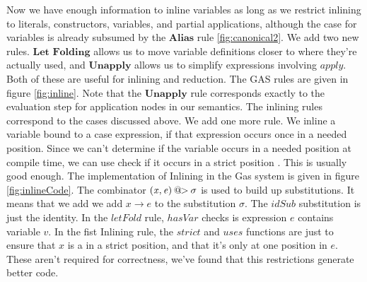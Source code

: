 \documentclass{book}
\theoremstyle{definition}
\newcommand{\Varid}[1]{\mathit{#1}}
\begin{document}
Now we have enough information to inline variables as long as we restrict inlining to
literals, constructors, variables, and partial applications,
although the case for variables is already subsumed by the \ensuremath{\textbf{Alias}} rule \ref{fig:canonical2}.
We add two new rules.  \ensuremath{\textbf{Let Folding}} allows us to move variable definitions
closer to where they're actually used,
and \ensuremath{\textbf{Unapply}} allows us to simplify expressions involving \ensuremath{\Varid{apply}}.
Both of these are useful for inlining and reduction.
The GAS rules are given in figure \ref{fig:inline}.
Note that the \ensuremath{\textbf{Unapply}} rule corresponds exactly to the evaluation step for application nodes
in our semantics.
The inlining rules correspond to the cases discussed above.
We add one more rule.  We inline a variable bound to a case expression,
if that expression occurs once in a needed position.
Since we can't determine if the variable occurs in a needed position at compile time,
we can use check if it occurs in a strict position \cite{strictAbstract}.
This is usually good enough.
The implementation of Inlining in the Gas system is given in figure \ref{fig:inlineCode}.
The combinator \ensuremath{(\Varid{x},\Varid{e})\hspace{2pt}\text{@}\hspace{-3pt}\mathbin{>}\sigma} is used to build up substitutions.
It means that we add we add $x \to e$ to the substitution \ensuremath{\sigma}.
The \ensuremath{\Varid{idSub}} substitution is just the identity.
In the \ensuremath{\Varid{letFold}} rule, \ensuremath{\Varid{hasVar}} checks is expression \ensuremath{\Varid{e}} contains variable \ensuremath{\Varid{v}}.
In the fist Inlining rule, the \ensuremath{\Varid{strict}} and \ensuremath{\Varid{uses}} functions are just to ensure that \ensuremath{\Varid{x}}
is a in a strict position, and that it's only at one position in \ensuremath{\Varid{e}}.
These aren't required for correctness,
we've found that this restrictions generate better code.
\end{document}
